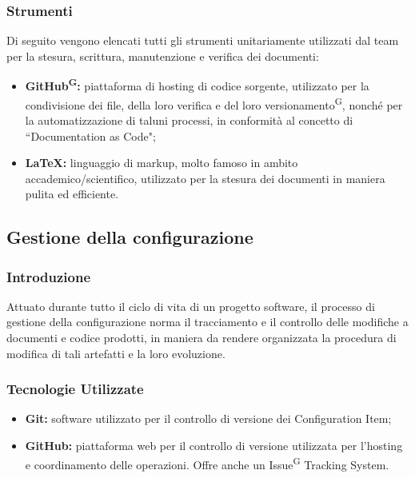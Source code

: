 \documentclass[8pt]{article}
\newcommand{\glossterm}[1]{#1\textsuperscript{G}} %
\begin{document}
\subsubsection{Strumenti}
Di seguito vengono elencati tutti gli strumenti unitariamente utilizzati dal team per la stesura, scrittura, manutenzione e verifica dei documenti:
\begin{itemize}
    \item \textbf{\glossterm{GitHub}:} piattaforma di hosting di codice sorgente, utilizzato per la condivisione dei file, della loro verifica e del loro \glossterm{versionamento}, nonché per la automatizzazione di taluni processi, in conformità al concetto di ``Documentation as Code";  
    \item \textbf{\LaTeX:} linguaggio di markup, molto famoso in ambito accademico/scientifico, utilizzato per la stesura dei documenti in maniera pulita ed efficiente.
\end{itemize}

\subsection{Gestione della configurazione} \label{sec:gestione}
\vspace{1em}
\subsubsection{Introduzione}
Attuato durante tutto il ciclo di vita di un progetto software, il processo di gestione della configurazione norma il tracciamento e il controllo delle modifiche a documenti e codice prodotti, in maniera da rendere organizzata la procedura di modifica di tali artefatti e la loro evoluzione.

\subsubsection{Tecnologie Utilizzate}

\begin{itemize}
    \item \textbf{Git:} software utilizzato per il controllo di versione dei Configuration Item;
    \item \textbf{GitHub:} piattaforma web per il controllo di versione utilizzata per l'hosting e coordinamento delle operazioni. Offre anche un \glossterm{Issue} Tracking System.
\end{itemize}
\end{document}
